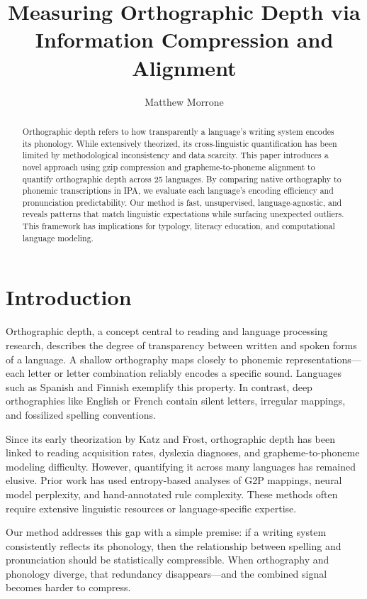 \documentclass[12pt]{article}
\title{Measuring Orthographic Depth via Information Compression and Alignment}
\author{Matthew Morrone}
\date{}
\begin{document}
\maketitle

\begin{abstract}
Orthographic depth refers to how transparently a language's writing system encodes its phonology. While extensively theorized, its cross-linguistic quantification has been limited by methodological inconsistency and data scarcity. This paper introduces a novel approach using gzip compression and grapheme-to-phoneme alignment to quantify orthographic depth across 25 languages. By comparing native orthography to phonemic transcriptions in IPA, we evaluate each language's encoding efficiency and pronunciation predictability. Our method is fast, unsupervised, language-agnostic, and reveals patterns that match linguistic expectations while surfacing unexpected outliers. This framework has implications for typology, literacy education, and computational language modeling.
\end{abstract}

\section{Introduction}
Orthographic depth, a concept central to reading and language processing research, describes the degree of transparency between written and spoken forms of a language. A shallow orthography maps closely to phonemic representations—each letter or letter combination reliably encodes a specific sound. Languages such as Spanish and Finnish exemplify this property. In contrast, deep orthographies like English or French contain silent letters, irregular mappings, and fossilized spelling conventions.

Since its early theorization by Katz and Frost, orthographic depth has been linked to reading acquisition rates, dyslexia diagnoses, and grapheme-to-phoneme modeling difficulty. However, quantifying it across many languages has remained elusive. Prior work has used entropy-based analyses of G2P mappings, neural model perplexity, and hand-annotated rule complexity. These methods often require extensive linguistic resources or language-specific expertise.

Our method addresses this gap with a simple premise: if a writing system consistently reflects its phonology, then the relationship between spelling and pronunciation should be statistically compressible. When orthography and phonology diverge, that redundancy disappears—and the combined signal becomes harder to compress.
\end{document}
